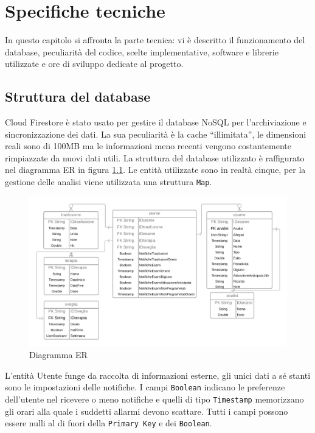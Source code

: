 \documentclass[12pt,a4paper,openright,twoside]{report}
\begin{document}
\chapter{Specifiche tecniche}
In questo capitolo si affronta la parte tecnica: vi è descritto il funzionamento del database, peculiarità del codice, scelte implementative, software e librerie utilizzate e ore di sviluppo dedicate al progetto.

\section{Struttura del database}
Cloud Firestore è stato usato per gestire il database NoSQL  per l'archiviazione e sincronizzazione dei dati. La sua peculiarità è la cache ``illimitata'', le dimensioni reali sono di 100MB ma le informazioni meno recenti vengono costantemente rimpiazzate da nuovi dati utili.
La struttura del database utilizzato è raffigurato nel diagramma ER in figura \ref{ER}. Le entità utilizzate sono in realtà cinque, per la gestione delle analisi viene utilizzata una struttura \verb#Map#. 

\begin{figure}
\begin{center}
\includegraphics[width=1\textwidth, keepaspectratio]{img/Diagrammi/Diagramma ER.png}
\caption{Diagramma ER} \label{ER}
\end{center}
\end{figure}

L'entità Utente funge da raccolta di informazioni esterne, gli unici dati a sé stanti sono le impostazioni delle notifiche. I campi \verb#Boolean# indicano le preferenze dell'utente nel ricevere o meno notifiche e quelli di tipo \verb#Timestamp# memorizzano gli orari alla quale i suddetti allarmi devono scattare. Tutti i campi possono essere nulli al di fuori della \verb#Primary Key# e dei \verb#Boolean#.
\end{document}
